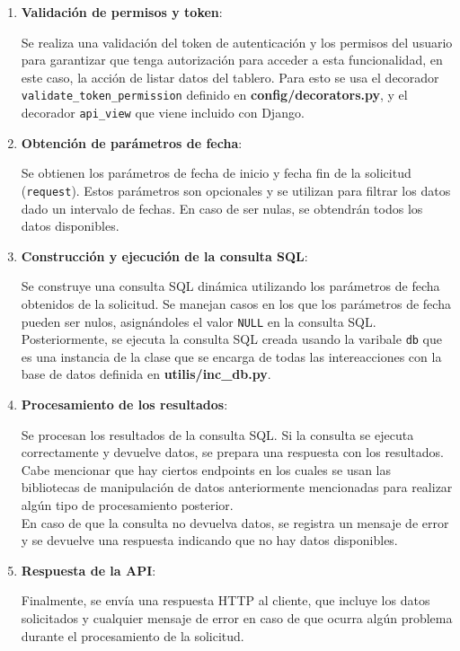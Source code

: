 \begin{enumerate}
    \item \textbf{Validación de permisos y token}:
    
       Se realiza una validación del token de autenticación y los permisos del usuario para garantizar que tenga autorización para acceder a esta funcionalidad, en este caso, la acción de listar datos del tablero. Para esto se usa el decorador \texttt{validate\_token\_permission} definido en \textbf{config/decorators.py}, y el decorador \texttt{api\_view} que viene incluido con Django.
    
    \item \textbf{Obtención de parámetros de fecha}:
    
        Se obtienen los parámetros de fecha de inicio y fecha fin de la solicitud (\texttt{request}). Estos parámetros son opcionales y se utilizan para filtrar los datos dado un intervalo de fechas. En caso de ser nulas, se obtendrán todos los datos disponibles.
    
    \item \textbf{Construcción y ejecución de la consulta SQL}:
   
   Se construye una consulta SQL dinámica utilizando los parámetros de fecha obtenidos de la solicitud. Se manejan casos en los que los parámetros de fecha pueden ser nulos, asignándoles el valor \texttt{NULL} en la consulta SQL. Posteriormente, se ejecuta la consulta SQL creada usando la varibale \texttt{db} que es una instancia de la clase que se encarga de todas las intereacciones con la base de datos definida en \textbf{utilis/inc\_db.py}.

    

    \item \textbf{Procesamiento de los resultados}:
    
     Se procesan los resultados de la consulta SQL. Si la consulta se ejecuta correctamente y devuelve datos, se prepara una respuesta con los resultados. Cabe mencionar que hay ciertos endpoints en los cuales se usan las bibliotecas de manipulación de datos anteriormente mencionadas para realizar algún tipo de procesamiento posterior.\\
        En caso de que la consulta no devuelva datos, se registra un mensaje de error y se devuelve una respuesta indicando que no hay datos disponibles.
    
    \item \textbf{Respuesta de la API}:
    
   Finalmente, se envía una respuesta HTTP al cliente, que incluye los datos solicitados y cualquier mensaje de error en caso de que ocurra algún problema durante el procesamiento de la solicitud.\\


\end{enumerate}
